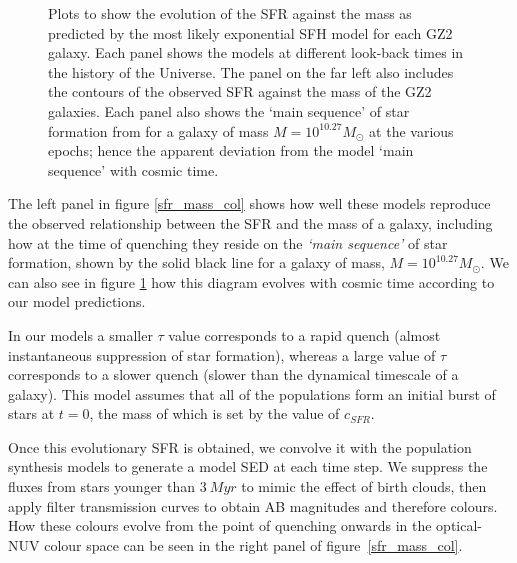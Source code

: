 \documentclass{mn2e}
\begin{document}
\begin{figure}
\caption{Plots to show the evolution of the SFR against the mass as predicted by the most likely exponential SFH model for each GZ2 galaxy. Each panel shows the models at different look-back times in the history of the Universe. The panel on the far left also includes the contours of the observed SFR against the mass of the GZ2 galaxies. Each panel also shows the `main sequence' of star formation from \citet{Peng} for a galaxy of mass $M=10^{10.27} M_{\odot}$ at the various epochs; hence the apparent deviation from the model `main sequence' with cosmic time.}
\label{sfr_mass_evo}
\end{figure}

The left panel in figure \ref{sfr_mass_col} shows how well these models reproduce the observed relationship between the SFR and the mass of a galaxy, including how at the time of quenching they reside on the \emph{`main sequence'} of star formation, shown by the solid black line for a galaxy of mass, $M = 10^{10.27} M_{\odot}$.  We can also see in figure \ref{sfr_mass_evo} how this diagram evolves with cosmic time according to our model predictions. 



In our models a smaller $\tau$ value corresponds to a rapid quench (almost instantaneous suppression of star formation), whereas a large value of $\tau$ corresponds to a slower quench (slower than the dynamical timescale of a galaxy).  This model assumes that all of the populations form an initial burst of stars at $t=0$, the mass of which is set by the value of $c_{SFR}$. %

Once this evolutionary SFR is obtained, we convolve it with the \citet{BC03} population synthesis models to generate a model SED at each time step. We suppress the fluxes from stars younger than $3~Myr$ to mimic the effect of birth clouds, then apply filter transmission curves to obtain AB magnitudes and therefore colours. How these colours evolve from the point of quenching onwards in the optical-NUV colour space can be seen in the right panel of figure~\ref{sfr_mass_col}.
\end{document}
